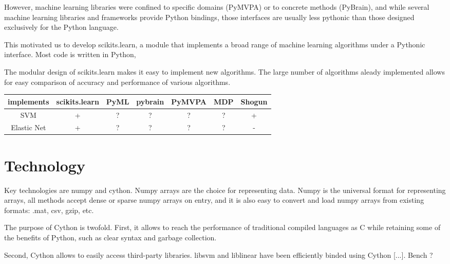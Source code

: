 \documentclass[twoside,11pt]{article}
\begin{document}
However, machine learning libraries were confined to specific domains
(PyMVPA) or to concrete methods (PyBrain), and while several machine
learning libraries and frameworks provide Python bindings, those
interfaces are usually less pythonic than those designed exclusively
for the Python language.


This motivated us to develop scikits.learn, a module that implements a
broad range of machine learning algorithms under a Pythonic
interface. Most code is written in Python, 

The modular design of scikits.learn makes it easy to implement new
algorithms. The large number of algorithms aleady implemented allows
for easy comparison of accuracy and performance of various algorithms.


\begin{center}


\begin{tabular}{c c c c c c c}
\hline\hline %
implements & scikits.learn & PyML & pybrain & PyMVPA &  MDP & Shogun \\ [0.5ex]
\hline
SVM        & + & ?   & ?       &  ?     & ?    & + \\
Elastic Net & + & ?   & ?       &  ?     & ?    & - \\

\hline
\end{tabular}
\end{center}


\section{Technology}

Key technologies are numpy and cython. Numpy arrays are the choice for
representing data. Numpy is the universal format for representing
arrays, all methods accept dense or sparse numpy arrays on entry, and
it is also easy to convert and load numpy arrays from existing formats:
.mat, csv, gzip, etc.

The purpose of Cython is twofold. First, it allows to reach the
performance of traditional compiled languages as C while retaining
some of the benefits of Python, such as clear syntax and garbage
collection.

Second, Cython allows to easily access third-party libraries. libsvm
and liblinear have been efficiently binded using Cython [...]. Bench ?
\end{document}
